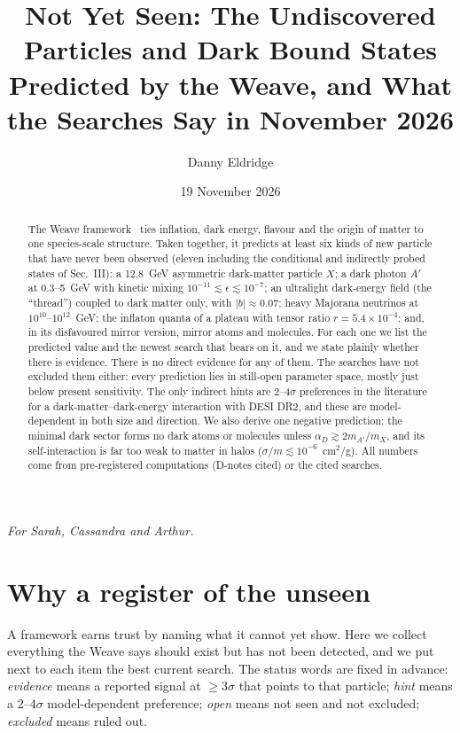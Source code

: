 \documentclass[aps,prd,twocolumn,superscriptaddress,nofootinbib,showkeys]{revtex4-2}
\begin{document}
\title{Not Yet Seen: The Undiscovered Particles and Dark Bound States Predicted by the Weave, and What the Searches Say in November 2026}
\author{Danny Eldridge}
\date{19 November 2026}
\begin{abstract}
The Weave framework~\cite{P1,FL,RT} ties inflation, dark energy, flavour and the origin of matter to one species-scale structure. Taken together, it predicts at least six kinds of new particle that have never been observed (eleven including the conditional and indirectly probed states of Sec.~III): a 12.8~GeV asymmetric dark-matter particle $X$; a dark photon $A'$ at 0.3--5~GeV with kinetic mixing $10^{-11}\lesssim\epsilon\lesssim10^{-7}$; an ultralight dark-energy field (the ``thread'') coupled to dark matter only, with $|b|\approx0.07$; heavy Majorana neutrinos at $10^{10}$--$10^{12}$~GeV; the inflaton quanta of a plateau with tensor ratio $r=5.4\times10^{-4}$; and, in its disfavoured mirror version, mirror atoms and molecules. For each one we list the predicted value and the newest search that bears on it, and we state plainly whether there is evidence. There is no direct evidence for any of them. The searches have not excluded them either: every prediction lies in still-open parameter space, mostly just below present sensitivity. The only indirect hints are 2--4$\sigma$ preferences in the literature for a dark-matter--dark-energy interaction with DESI DR2, and these are model-dependent in both size and direction. We also derive one negative prediction: the minimal dark sector forms no dark atoms or molecules unless $\alpha_D\gtrsim2m_{A'}/m_X$, and its self-interaction is far too weak to matter in halos ($\sigma/m\lesssim10^{-6}$~cm$^2$/g). All numbers come from pre-registered computations (D-notes cited) or the cited searches.
\end{abstract}
\maketitle
\begin{center}\emph{For Sarah, Cassandra and Arthur.}\end{center}

\section{Why a register of the unseen}
A framework earns trust by naming what it cannot yet show. Here we collect everything the Weave says should exist but has not been detected, and we put next to each item the best current search. The status words are fixed in advance: \emph{evidence} means a reported signal at $\ge3\sigma$ that points to that particle; \emph{hint} means a $2$--$4\sigma$ model-dependent preference; \emph{open} means not seen and not excluded; \emph{excluded} means ruled out.
\end{document}
